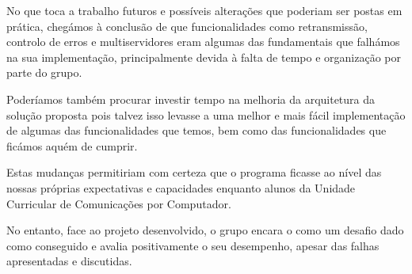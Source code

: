 \documentclass[11pt]{article}
\begin{document}
\par No que toca a trabalho futuros e possíveis alterações que poderiam ser postas em prática, chegámos à conclusão de que funcionalidades como retransmissão, controlo de erros e multiservidores eram algumas das fundamentais que falhámos na sua implementação, principalmente devida à falta de tempo e organização por parte do grupo.\\

\par Poderíamos também procurar investir tempo na melhoria da arquitetura da solução proposta pois talvez isso levasse a uma melhor e mais fácil implementação de algumas das funcionalidades que temos, bem como das funcionalidades que ficámos aquém de cumprir.\\

\par Estas mudanças permitiriam com certeza que o programa ficasse ao nível das nossas próprias expectativas e capacidades enquanto alunos da Unidade Curricular de Comunicações por Computador.\\

\par No entanto, face ao projeto desenvolvido, o grupo encara o como um desafio dado como conseguido e avalia positivamente o seu desempenho, apesar das falhas apresentadas e discutidas.

\end{document}
